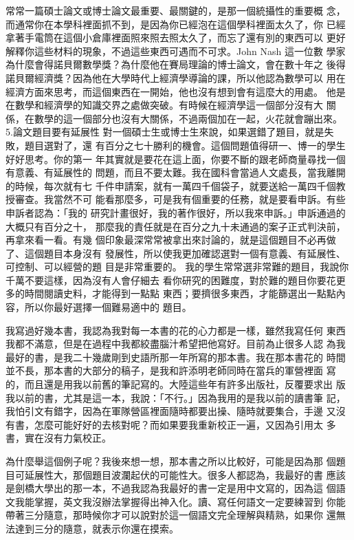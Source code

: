 常常一篇碩士論文或博士論文最重要、最關鍵的，是那一個統攝性的重要概
念，而通常你在本學科裡面抓不到，是因為你已經泡在這個學科裡面太久了，你
已經拿著手電筒在這個小倉庫裡面照來照去照太久了，而忘了還有別的東西可以
更好解釋你這些材料的現象，不過這些東西可遇而不可求。John Nash 這一位數
學家為什麼會得諾貝爾數學獎？為什麼他在賽局理論的博士論文，會在數十年之
後得諾貝爾經濟獎？因為他在大學時代上經濟學導論的課，所以他認為數學可以
用在經濟方面來思考，而這個東西在一開始，他也沒有想到會有這麼大的用處。
他是在數學和經濟學的知識交界之處做突破。有時候在經濟學這一個部分沒有大
關係，在數學的這一個部分也沒有大關係，不過兩個加在一起，火花就會蹦出來。 
5.論文題目要有延展性
對一個碩士生或博士生來說，如果選錯了題目，就是失敗，題目選對了，還
有百分之七十勝利的機會。這個問題值得研一、博一的學生好好思考。你的第一
年其實就是要花在這上面，你要不斷的跟老師商量尋找一個有意義、有延展性的
問題，而且不要太難。我在國科會當過人文處長，當我離開的時候，每次就有七
千件申請案，就有一萬四千個袋子，就要送給一萬四千個教授審查。我當然不可
能看那麼多，可是我有個重要的任務，就是要看申訴。有些申訴者認為：「我的
研究計畫很好，我的著作很好，所以我來申訴。」申訴通過的大概只有百分之十，
那麼我的責任就是在百分之九十未通過的案子正式判決前，再拿來看一看。有幾
個印象最深常常被拿出來討論的，就是這個題目不必再做了、這個題目本身沒有
發展性，所以使我更加確認選對一個有意義、有延展性、可控制、可以經營的題
目是非常重要的。
我的學生常常選非常難的題目，我說你千萬不要這樣，因為沒有人會仔細去
看你研究的困難度，對於難的題目你要花更多的時間閱讀史料，才能得到一點點
東西；要擠很多東西，才能篩選出一點點內容，所以你最好選擇一個難易適中的
題目。

我寫過好幾本書，我認為我對每一本書的花的心力都是一樣，雖然我寫任何
東西我都不滿意，但是在過程中我都絞盡腦汁希望把他寫好。目前為止很多人認
為我最好的書，是我二十幾歲剛到史語所那一年所寫的那本書。我在那本書花的
時間並不長，那本書的大部分的稿子，是我和許添明老師同時在當兵的軍營裡面
寫的，而且還是用我以前舊的筆記寫的。大陸這些年有許多出版社，反覆要求出
版我以前的書，尤其是這一本，我說：「不行。」因為我用的是我以前的讀書筆
記，我怕引文有錯字，因為在軍隊營區裡面隨時都要出操、隨時就要集合，手邊
又沒有書，怎麼可能好好的去核對呢？而如果要我重新校正一遍，又因為引用太
多書，實在沒有力氣校正。

為什麼舉這個例子呢？我後來想一想，那本書之所以比較好，可能是因為那
個題目可延展性大，那個題目波瀾起伏的可能性大。很多人都認為，我最好的書
應該是劍橋大學出的那一本，不過我認為我最好的書一定是用中文寫的，因為這
個語文我能掌握，英文我沒辦法掌握得出神入化。讀、寫任何語文一定要練習到
你能帶著三分隨意，那時候你才可以說對於這一個語文完全理解與精熟，如果你
還無法達到三分的隨意，就表示你還在摸索。


